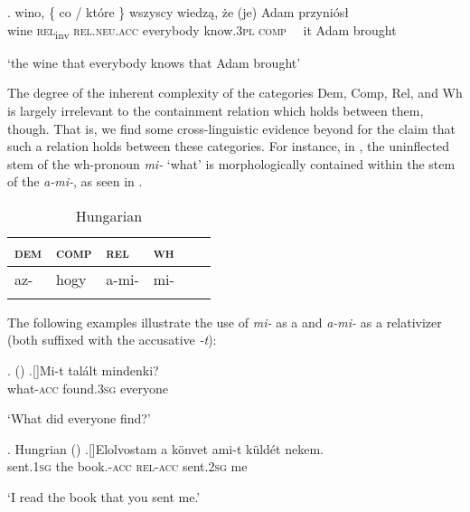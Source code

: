 \exg. wino, \{ co / {kt\'ore \}} wszyscy wiedz\k{a}, \.ze (je) Adam przyni\'os\l\\
wine {} \textsc{rel}\textsubscript{inv} {} \textsc{rel.neu.acc} everybody know.\textsc{3pl} \textsc{comp} \ \ it Adam brought\\
\strut `the wine that everybody knows that Adam brought'

\noindent The degree of the inherent complexity of the categories Dem, Comp, Rel, and Wh is largely irrelevant to the containment relation which holds between them, though. That is, we find some cross-linguistic evidence beyond  for the claim that such a relation holds between these categories. For instance, in , the uninflected stem of the wh-pronoun \textit{mi-} `what' is morphologically contained within the stem of the  \textit{a-mi-}, as seen in .

\begin{table}
\caption{Hungarian}
\label{Ungarowie}
\begin{tabular}[t]{ l l l l l l }
\lsptoprule
\textsc{dem} 	& \textsc{comp} & \textsc{rel}  	& \textsc{wh}\\	
\midrule
az- & hogy & a-mi- & mi-\\
\lspbottomrule
\end{tabular}
\end{table}

\noindent The following examples illustrate the use of \textit{mi-} as a  and \textit{a-mi-} as a relativizer (both suffixed with the accusative \textit{-t}):

\ex.  (\citealt[11]{Kenesei1998})
\ag.[]\hspace{-22pt}Mi-t 	tal\'alt 	mindenki?\\
\hspace{-22pt}what-\textsc{acc} 	found.\textsc{3sg} 	everyone\\
\hspace{-22pt}\strut `What did everyone find?'

\ex. Hungrian (\citealt[136]{Rounds2001})
\ag.[]\hspace{-22pt}Elolvostam a 	k\"onvet 	ami-t k\"uld\'et nekem.\\
\hspace{-22pt}sent.\textsc{1sg} the	book.\textsc{-acc}	\textsc{rel-acc}	sent.\textsc{2sg} me\\
\hspace{-22pt}\strut `I read the book that you sent me.'


